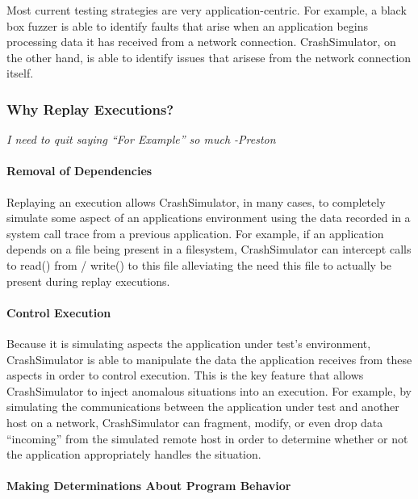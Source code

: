         Most current testing strategies are very application-centric.  For example, a black box fuzzer is able to
        identify faults that arise when an application begins processing data it has received from a network
        connection. CrashSimulator, on the other hand, is able to identify issues that arisese from the network connection
        itself.

    \subsubsection{Why Replay Executions?}

    \emph{I need to quit saying ``For Example'' so much -Preston}

    \paragraph{Removal of Dependencies}

    Replaying an execution allows CrashSimulator, in many cases, to completely simulate some aspect of an applications
    environment using the data recorded in a system call trace from a previous application.  For example, if an
    application depends on a file being present in a filesystem, CrashSimulator can intercept calls to read()
    from / write() to this file alleviating the need this file to actually be present during replay executions.

    \paragraph{Control Execution}

    Because it is simulating aspects the application under test's environment, CrashSimulator is able to manipulate the
    data the application receives from these aspects in order to control execution.  This is the key feature that allows
    CrashSimulator to inject anomalous situations into an execution.  For example, by simulating the communications
    between the application under test and another host on a network, CrashSimulator can fragment, modify, or even drop
    data ``incoming'' from the simulated remote host in order to determine whether or not the application appropriately
    handles the situation. 
    
    \paragraph{Making Determinations About Program Behavior}

